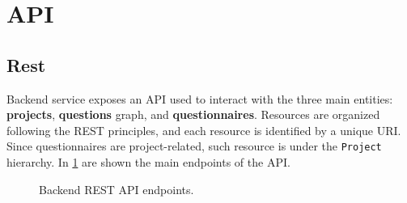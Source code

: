 \documentclass[12pt,a4paper,openright,twoside]{book}
\begin{document}
\section{\acs{API}}

\subsection{Rest}

Backend service exposes an \ac{API} used to interact with the three main entities: \textbf{projects}, \textbf{questions} graph, and \textbf{questionnaires}.
%
Resources are organized following the REST principles, and each resource is identified by a unique URI.
%
Since questionnaires are project-related, such resource is under the \texttt{Project} hierarchy.
%
In \cref{fig:rest-api} are shown the main endpoints of the \ac{API}.


\begin{figure}
    \centering
    \hfill
    \hfill
    
    \caption{Backend REST \ac{API} endpoints.}
    \label{fig:rest-api}
\end{figure}
\end{document}
